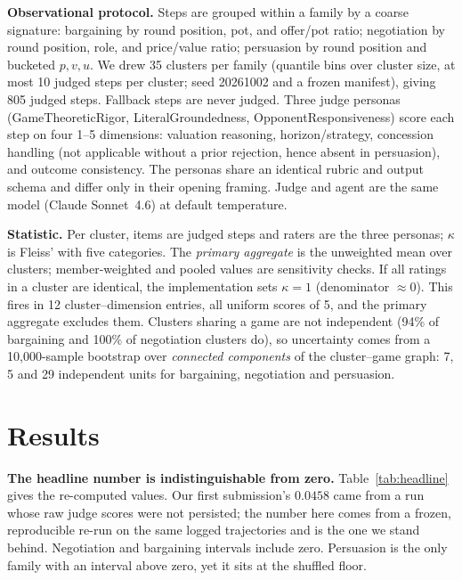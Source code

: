 \documentclass{article}
\begin{document}
\textbf{Observational protocol.} Steps are grouped within a family by a coarse signature: bargaining by round position, pot, and offer/pot ratio; negotiation by round position, role, and price/value ratio; persuasion by round position and bucketed $p,v,u$. We drew 35 clusters per family (quantile bins over cluster size, at most 10 judged steps per cluster; seed 20261002 and a frozen manifest), giving 805 judged steps. Fallback steps are never judged. Three judge personas (GameTheoreticRigor, LiteralGroundedness, OpponentResponsiveness) score each step on four 1--5 dimensions: valuation reasoning, horizon/strategy, concession handling (not applicable without a prior rejection, hence absent in persuasion), and outcome consistency. The personas share an identical rubric and output schema and differ only in their opening framing. Judge and agent are the same model (Claude Sonnet~4.6) at default temperature.

\textbf{Statistic.} Per cluster, items are judged steps and raters are the three personas; $\kappa$ is Fleiss' with five categories. The \emph{primary aggregate} is the unweighted mean over clusters; member-weighted and pooled values are sensitivity checks. If all ratings in a cluster are identical, the implementation sets $\kappa=1$ (denominator $\approx 0$). This fires in 12 cluster--dimension entries, all uniform scores of 5, and the primary aggregate excludes them. Clusters sharing a game are not independent (94\% of bargaining and 100\% of negotiation clusters do), so uncertainty comes from a 10{,}000-sample bootstrap over \emph{connected components} of the cluster--game graph: 7, 5 and 29 independent units for bargaining, negotiation and persuasion.

\section{Results}
\label{sec:results}

\textbf{The headline number is indistinguishable from zero.} Table~\ref{tab:headline} gives the re-computed values. Our first submission's $0.0458$ came from a run whose raw judge scores were not persisted; the number here comes from a frozen, reproducible re-run on the same logged trajectories and is the one we stand behind. Negotiation and bargaining intervals include zero. Persuasion is the only family with an interval above zero, yet it sits at the shuffled floor.
\end{document}
